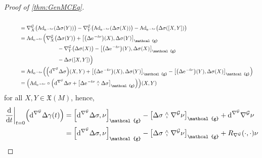 \documentclass[reqno,a4paper,oneside]{amsart}
\newcommand{\e}{\ensuremath{\mathrm{e\;\!}}}
\theoremstyle{plain}
\theoremstyle{remark}
\theoremstyle{definition}
\begin{document}
\begin{proof}[Proof of \ref{thm:GenMCEq}]
\begin{align*}
\\
&\hspace{1cm}=
\nabla^{\mathcal{G}}_X \bigl( \mathrm{Ad}_{\e^{-t\nu}} \mleft( \Delta \sigma(Y)\mright) \bigr)
	- \nabla^{\mathcal{G}}_Y \bigl( \mathrm{Ad}_{\e^{-t\nu}} \mleft( \Delta \sigma(X)\mright) \bigr)
	- \mathrm{Ad}_{\e^{-t\nu}} \bigl( \Delta \sigma([X, Y])\bigr)
\\
&\hspace{1cm}=
\mathrm{Ad}_{\e^{-t\nu}} \Bigl(
	\nabla^{\mathcal{G}}_X \bigl( \Delta \sigma(Y) \bigr)
	+ \mleft[\mleft(\Delta \e^{-t\nu}\mright)(X), \Delta \sigma(Y) \mright]_{\mathcal{g}}
\\
&\hspace{3.5cm}
	- \nabla^{\mathcal{G}}_Y \bigl( \Delta \sigma(X) \bigr)
	- \mleft[\mleft(\Delta \e^{-t\nu}\mright)(Y), \Delta \sigma(X) \mright]_{\mathcal{g}}
\\
&\hspace{3.5cm}
	-\Delta \sigma([X, Y])
\Bigr)
\\
&\hspace{1cm}=
\mathrm{Ad}_{\e^{-t\nu}} \mleft(
	\mleft(\mathrm{d}^{\nabla^{\mathcal{G}}} \Delta \sigma\mright)(X, Y)
	+ \mleft[\mleft(\Delta \e^{-t\nu}\mright)(X), \Delta \sigma(Y) \mright]_{\mathcal{g}}
	- \mleft[\mleft(\Delta \e^{-t\nu}\mright)(Y), \Delta \sigma(X) \mright]_{\mathcal{g}}
\mright)
\\
&\hspace{1cm}=
\mleft(\mathrm{Ad}_{\e^{-t\nu}} \circ \mleft(
	\mathrm{d}^{\nabla^{\mathcal{G}}} \Delta \sigma
	+ \mleft[\Delta \e^{-t\nu} \stackrel{\wedge}{,} \Delta \sigma \mright]_{\mathcal{g}}
\mright)\mright)(X, Y)
\end{align*}
for all $X, Y \in \mathfrak{X}(M)$, hence,
\begin{align*}
\mleft. \frac{\mathrm{d}}{\mathrm{d}t} \mright|_{t=0}\mleft(
	\mathrm{d}^{\nabla^{\mathcal{G}}} \Delta \gamma(t)
\mright)
&=
\mleft[ \mathrm{d}^{\nabla^{\mathcal{G}}} \Delta \sigma, \nu \mright]_{\mathcal{g}}
	- \mleft[\Delta \sigma \stackrel{\wedge}{,} \nabla^{\mathcal{G}}\nu \mright]_{\mathcal{g}}
	+ \mathrm{d}^{\nabla^{\mathcal{G}}} \nabla^{\mathcal{G}}\nu
\\
&=
\mleft[ \mathrm{d}^{\nabla^{\mathcal{G}}} \Delta \sigma, \nu \mright]_{\mathcal{g}}
	- \mleft[\Delta \sigma \stackrel{\wedge}{,} \nabla^{\mathcal{G}}\nu \mright]_{\mathcal{g}}
	+ R_{\nabla^{\mathcal{G}}} (\cdot, \cdot) \nu
\end{align*}

\end{proof}
\end{document}

